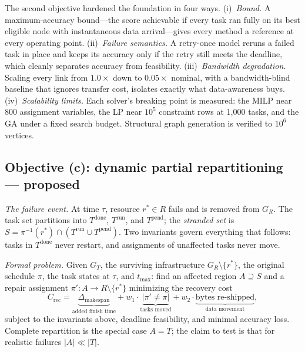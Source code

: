 \documentclass[11pt]{article}
\begin{document}
The second objective hardened the foundation in four ways.
(i)~\emph{Bound.} A maximum-accuracy bound---the score
achievable if every task ran fully on its best eligible node
with instantaneous data arrival---gives every method a
reference at every operating point. (ii)~\emph{Failure
semantics.} A retry-once model reruns a failed task in place and
keeps its accuracy only if the retry still meets the deadline,
which cleanly separates accuracy from feasibility.
(iii)~\emph{Bandwidth degradation.} Scaling every link from
$1.0\times$ down to $0.05\times$ nominal, with a bandwidth-blind
baseline that ignores transfer cost, isolates exactly what
data-awareness buys. (iv)~\emph{Scalability limits.} Each
solver's breaking point is measured: the MILP near 800
assignment variables, the LP near $10^5$ constraint rows at
1,000 tasks, and the GA under a fixed search budget. Structural
graph generation is verified to $10^6$ vertices.

\subsection{Objective (c): dynamic partial repartitioning ---
proposed}
\label{sec:objc}

\emph{The failure event.} At time $\tau$, resource
$r^{*}\in R$ fails and is removed from $G_R$. The task set
partitions into $T^{\mathrm{done}}$, $T^{\mathrm{run}}$, and
$T^{\mathrm{pend}}$; the \emph{stranded set} is
$S=\pi^{-1}(r^{*})\cap(T^{\mathrm{run}}\cup T^{\mathrm{pend}})$.
Two invariants govern everything that follows: tasks in
$T^{\mathrm{done}}$ never restart, and assignments of unaffected
tasks never move.

\emph{Formal problem.} Given $G_T$, the surviving infrastructure
$G_R\setminus\{r^{*}\}$, the original schedule $\pi$, the task
states at $\tau$, and $t_{\max}$: find an affected region
$A\supseteq S$ and a repair assignment
$\pi':A\rightarrow R\setminus\{r^{*}\}$ minimizing the recovery
cost
\begin{equation}
C_{\mathrm{rec}} =
\underbrace{\Delta_{\mathrm{makespan}}}_{\text{added finish
time}} + w_1\cdot\underbrace{|\pi'\neq\pi|}_{\text{tasks moved}}
+ w_2\cdot\underbrace{\text{bytes re-shipped}}_{\text{data
movement}},
\label{eq:crec}
\end{equation}
subject to the invariants above, deadline feasibility, and
minimal accuracy loss. Complete repartition is the special case
$A=T$; the claim to test is that for realistic failures
$|A|\ll|T|$.
\end{document}
